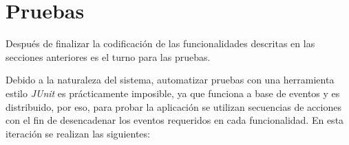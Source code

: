 \section{Pruebas}


Después de finalizar la codificación de las funcionalidades descritas en las secciones anteriores es el turno para las pruebas. 
\newline

Debido a la naturaleza del sistema, automatizar pruebas con una herramienta estilo \emph{JUnit} es prácticamente imposible, ya que funciona a base de eventos y es distribuido, por eso, para probar la aplicación se utilizan secuencias de acciones con el fin de desencadenar los eventos requeridos en cada funcionalidad. En esta iteración se realizan las siguientes:

